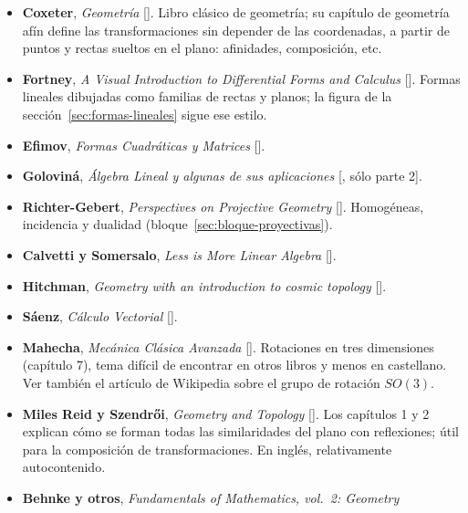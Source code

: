 \begin{itemize}
  [].
  \item \textbf{Coxeter}, \emph{Geometría} []. Libro clásico
  de geometría; su capítulo de geometría afín define las transformaciones sin depender de las
  coordenadas, a partir de puntos y rectas sueltos en el plano: afinidades, composición, etc.
  \item \textbf{Fortney}, \emph{A Visual Introduction to Differential Forms and Calculus}
  [].
  Formas lineales dibujadas como familias de rectas y planos; la figura de la
  sección~\ref{sec:formas-lineales} sigue ese estilo.
  \item \textbf{Efimov}, \emph{Formas Cuadráticas y Matrices} [].
  \item \textbf{Goloviná}, \emph{Álgebra Lineal y algunas de sus aplicaciones}
  [, sólo parte 2].
  \item \textbf{Richter-Gebert}, \emph{Perspectives on Projective Geometry}
  []. Homogéneas, incidencia y
  dualidad (bloque~\ref{sec:bloque-proyectivas}).
  \item \textbf{Calvetti y Somersalo}, \emph{Less is More Linear Algebra}
  [].
  \item \textbf{Hitchman}, \emph{Geometry with an introduction to cosmic topology}
  [].
  \item \textbf{Sáenz}, \emph{Cálculo Vectorial} [].
  \item \textbf{Mahecha}, \emph{Mecánica Clásica Avanzada}
  []. Rotaciones en tres
  dimensiones (capítulo 7), tema difícil de encontrar en otros libros y menos en castellano.
  Ver también el artículo de Wikipedia sobre el grupo de rotación \(SO(3)\).
  \item \textbf{Miles Reid y Szendr\H{o}i}, \emph{Geometry and Topology}
  []. Los capítulos 1 y 2 explican
  cómo se forman todas las similaridades del plano con reflexiones; útil para la composición
  de transformaciones. En inglés, relativamente autocontenido.
  \item \textbf{Behnke y otros}, \emph{Fundamentals of Mathematics, vol.~2: Geometry}

\end{itemize}
